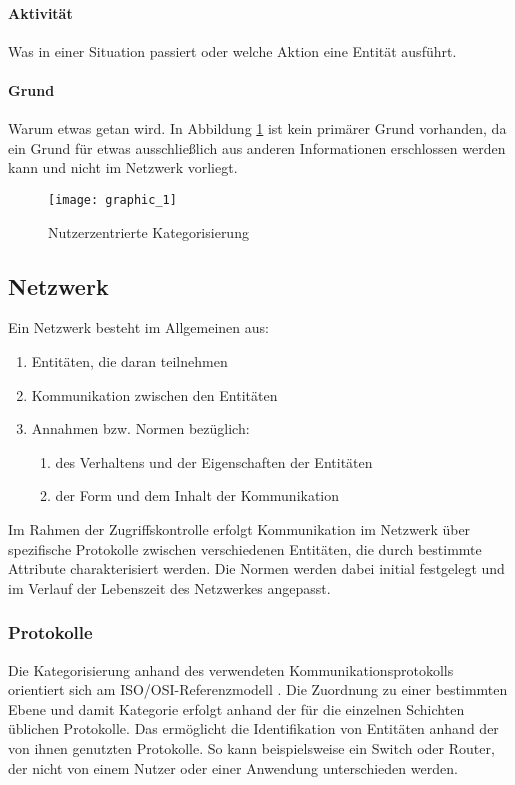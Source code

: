 \paragraph{Aktivität}
Was in einer Situation passiert oder welche Aktion eine Entität ausführt.
\paragraph{Grund}
Warum etwas getan wird. In  Abbildung \ref{Tax_1}  ist kein primärer Grund vorhanden, da ein Grund für etwas ausschließlich aus anderen Informationen erschlossen werden kann und nicht im Netzwerk vorliegt.
\begin{figure}[H]
\label{Tax_1}
\centering
\texttt{[image: graphic\_1]}
\caption{Nutzerzentrierte Kategorisierung}
\end{figure}
\subsection{Netzwerk}
Ein Netzwerk besteht im Allgemeinen aus:
\begin{enumerate}
\item{Entitäten, die daran teilnehmen}
\item{Kommunikation zwischen den Entitäten}
\item{Annahmen bzw. Normen bezüglich:}
\begin{enumerate}
	\item{des Verhaltens und der Eigenschaften der Entitäten}
	\item{der Form und dem Inhalt der Kommunikation}
\end{enumerate}
\end{enumerate}
Im Rahmen der Zugriffskontrolle erfolgt Kommunikation im Netzwerk über spezifische Protokolle zwischen verschiedenen Entitäten, die durch bestimmte Attribute charakterisiert werden. Die Normen werden dabei initial festgelegt und im Verlauf der Lebenszeit des Netzwerkes angepasst.
\subsubsection{Protokolle}
Die Kategorisierung anhand des verwendeten Kommunikationsprotokolls orientiert sich am ISO/OSI-Referenzmodell \cite{day1983osi}. Die Zuordnung zu einer bestimmten Ebene und damit Kategorie erfolgt anhand der für die einzelnen Schichten üblichen Protokolle. Das ermöglicht die Identifikation von Entitäten anhand der von ihnen genutzten Protokolle. So kann beispielsweise ein Switch oder Router, der nicht von einem Nutzer oder einer Anwendung unterschieden werden.
